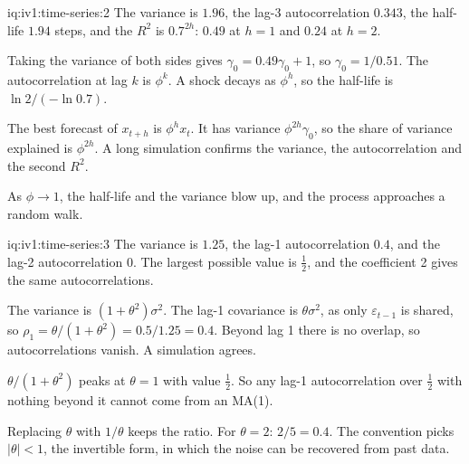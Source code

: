 \begin{solution}{iq:iv1:time-series:2}
The variance is $1.96$, the lag-3 autocorrelation $0.343$, the half-life $1.94$ steps, and the $R^2$ is $0.7^{2h}$: $0.49$ at $h = 1$ and $0.24$ at $h = 2$.

Taking the variance of both sides gives $\gamma_0 = 0.49\gamma_0 + 1$, so $\gamma_0 = 1/0.51$. The autocorrelation at lag $k$ is $\phi^k$. A shock decays as $\phi^h$, so the half-life is $\ln 2/(-\ln 0.7)$.

The best forecast of $x_{t + h}$ is $\phi^hx_t$. It has variance $\phi^{2h}\gamma_0$, so the share of variance explained is $\phi^{2h}$. A long simulation confirms the variance, the autocorrelation and the second $R^2$.

As $\phi \to 1$, the half-life and the variance blow up, and the process approaches a random walk.



\end{solution}

\begin{solution}{iq:iv1:time-series:3}
The variance is $1.25$, the lag-1 autocorrelation $0.4$, and the lag-2 autocorrelation 0. The largest possible value is $\frac12$, and the coefficient 2 gives the same autocorrelations.

The variance is $(1 + \theta^2)\sigma^2$. The lag-1 covariance is $\theta\sigma^2$, as only $\varepsilon_{t - 1}$ is shared, so $\rho_1 = \theta/(1 + \theta^2) = 0.5/1.25 = 0.4$. Beyond lag 1 there is no overlap, so autocorrelations vanish. A simulation agrees.

$\theta/(1 + \theta^2)$ peaks at $\theta = 1$ with value $\frac12$. So any lag-1 autocorrelation over $\frac12$ with nothing beyond it cannot come from an MA(1).

Replacing $\theta$ with $1/\theta$ keeps the ratio. For $\theta = 2$: $2/5 = 0.4$. The convention picks $|\theta| < 1$, the invertible form, in which the noise can be recovered from past data.



\end{solution}

